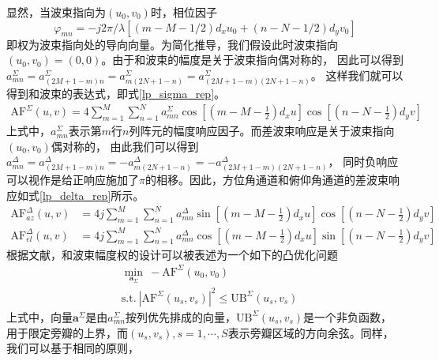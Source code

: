 \documentclass[master]{thesis-uestc}
\begin{document}
显然，当波束指向为$(u_0,v_0)$时，相位因子
$$
\varphi_{mn}=-j2\pi/\lambda\left[\left(m-M-1/2\right)d_xu_0+\left(n-N-1/2\right)d_yv_0\right]
$$
即权为波束指向处的导向向量。为简化推导，我们假设此时波束指向$(u_0,v_0)=(0,0)$。由于和波束的幅度是关于波束指向偶对称的，
因此可以得到$a^\Sigma_{mn}=a^\Sigma_{(2M+1-m)n}=a^\Sigma_{m(2N+1-n)}=a^\Sigma_{(2M+1-m)(2N+1-n)}$。
这样我们就可以得到和波束的表达式，即式\eqref{lp_sigma_rep}。
\begin{equation}\label{lp_sigma_rep}
    \begin{aligned}
        \text{AF}^\Sigma(u,v) = 
        4\sum_{m=1}^{M}\sum_{n=1}^{N}a^\Sigma_{mn}
        \cos\left[\left(m-M-\frac{1}{2}\right)d_xu\right]\cos\left[\left(n-N-\frac{1}{2}\right)d_yv\right]
    \end{aligned}
\end{equation}
上式中，$a^\Sigma_{mn}$表示第$m$行$n$列阵元的幅度响应因子。而差波束响应是关于波束指向$(u_0,v_0)$偶对称的，
由此我们可以得到$a^\Delta_{mn}=a^\Delta_{(2M+1-m)n}=-a^\Delta_{m(2N+1-n)}=-a^\Delta_{(2M+1-m)(2N+1-n)}$，
同时负响应可以视作是给正响应施加了$\pi$的相移。因此，方位角通道和俯仰角通道的差波束响应如式\eqref{lp_delta_rep}所示。
\begin{subequations}\label{lp_delta_rep}
    \begin{align}
        \text{AF}^\Delta_{az}(u,v)&=
        4j\sum_{m=1}^M\sum_{n=1}^Na^\Delta_{mn}
        \sin\left[\left(m-M-\frac{1}{2}\right)d_xu\right]\cos\left[\left(n-N-\frac{1}{2}\right)d_yv\right] \\
        \text{AF}^\Delta_{el}(u,v)&=
        4j\sum_{m=1}^M\sum_{n=1}^Na^\Delta_{mn}
        \cos\left[\left(m-M-\frac{1}{2}\right)d_xu\right]\sin\left[\left(n-N-\frac{1}{2}\right)d_yv\right]
    \end{align}
\end{subequations}
根据文献\cite{Rocca}，和波束幅度权的设计可以被表述为一个如下的凸优化问题
\begin{equation}\label{lp_sigma_opt}
    \begin{aligned}
        &\min_{\bm{a}_\Sigma} ~ -\text{AF}^\Sigma(u_0,v_0) \\
        &\text{s.t.} ~ \left|\text{AF}^\Sigma(u_s,v_s)\right|^2 \leqslant \text{UB}^\Sigma(u_s,v_s)
    \end{aligned}
\end{equation}
上式中，向量$\bm{a}^\Sigma$是由$a_{mn}^\Sigma$按列优先排成的向量，$\text{UB}^\Sigma(u_s,v_s)$是一个非负函数，
用于限定旁瓣的上界，而$(u_s,v_s),s=1,\cdots,S$表示旁瓣区域的方向余弦。同样，我们可以基于相同的原则，
\end{document}
